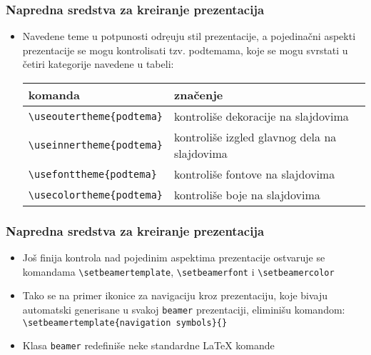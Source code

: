\documentclass{beamer}
\begin{document}
\begin{frame}[fragile]\frametitle{Napredna sredstva za kreiranje prezentacija}
	\begin{itemize}	
		\item	Navedene teme u potpunosti odre\d{}uju stil prezentacije, a 
		pojedinačni aspekti prezentacije se mogu kontrolisati tzv. podtemama, 
		koje se mogu svrstati u četiri kategorije navedene u tabeli: 		
		\begin{tabular}{|l|l|}
			\hline	
			\footnotesize	komanda & \footnotesize značenje\\
			\hline
			\hline \footnotesize
			\footnotesize   \verb"\useoutertheme{podtema}" &\footnotesize kontroliše dekoracije na slajdovima \\
			\footnotesize	\verb"\useinnertheme{podtema}" &\footnotesize kontroliše izgled glavnog dela na slajdovima \\
			\footnotesize	\verb"\usefonttheme{podtema}" &\footnotesize kontroliše fontove na slajdovima \\
			\footnotesize	\verb"\usecolortheme{podtema}" &\footnotesize kontroliše boje na slajdovima\\
			\hline
		\end{tabular}
	\end{itemize}
\end{frame}

\begin{frame}[fragile]\frametitle{Napredna sredstva za kreiranje prezentacija}
	\begin{itemize}	
		\item Još finija kontrola nad pojedinim aspektima prezentacije ostvaruje se komandama
		\verb"\setbeamertemplate", \verb"\setbeamerfont" i \verb"\setbeamercolor"		
		\item	Tako se na primer ikonice za navigaciju kroz prezentaciju, koje bivaju automatski generisane u svakoj
		\verb"beamer" prezentaciji, eliminišu komandom: \verb"\setbeamertemplate{navigation symbols}{}"		
		\item	Klasa \verb"beamer" redefiniše neke standardne \LaTeX{} komande  		
	\end{itemize}
\end{frame}
\end{document}
